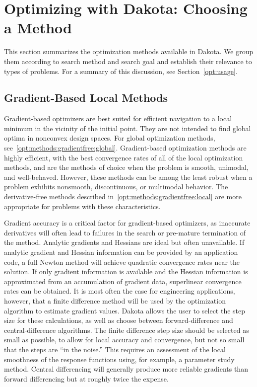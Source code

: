 \section{Optimizing with Dakota: Choosing a Method}
\label{opt:methods}

This section summarizes the optimization methods available in
Dakota. We group them according to search method and search goal and
establish their relevance to types of problems. For a summary of this
discussion, see Section~\ref{opt:usage}.

\subsection{Gradient-Based Local Methods}
\label{opt:methods:gradient}

Gradient-based optimizers are best suited for efficient navigation to
a local minimum in the vicinity of the initial point.  They are not
intended to find global optima in nonconvex design spaces.  For global
optimization methods, see~\ref{opt:methods:gradientfree:global}.
Gradient-based optimization methods are highly efficient, with the
best convergence rates of all of the local optimization methods, and
are the methods of choice when the problem is smooth, unimodal, and
well-behaved. However, these methods can be among the least robust
when a problem exhibits nonsmooth, discontinuous, or multimodal
behavior.  The derivative-free methods described
in~\ref{opt:methods:gradientfree:local} are more appropriate for
problems with these characteristics.

Gradient accuracy is a critical factor for gradient-based optimizers,
as inaccurate derivatives will often lead to failures in the search or
pre-mature termination of the method.  Analytic gradients and Hessians
are ideal but often unavailable.  If analytic gradient and Hessian
information can be provided by an application code, a full Newton
method will achieve quadratic convergence rates near the solution. If
only gradient information is available and the Hessian information is
approximated from an accumulation of gradient data, superlinear
convergence rates can be obtained.  It is most often the case for
engineering applications, however, that a finite difference method
will be used by the optimization algorithm to estimate gradient
values. Dakota allows the user to select the step size for these
calculations, as well as choose between forward-difference and
central-difference algorithms. The finite difference step size should
be selected as small as possible, to allow for local accuracy and
convergence, but not so small that the steps are ``in the noise.''
This requires an assessment of the local smoothness of the response
functions using, for example, a parameter study method. Central
differencing will generally produce more reliable gradients than
forward differencing but at roughly twice the expense.

